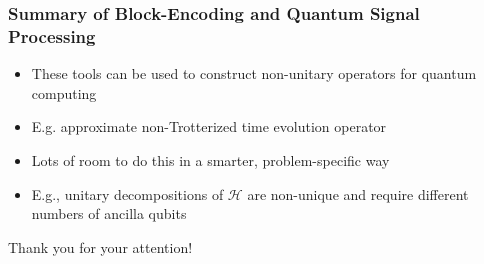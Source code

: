 \documentclass[aspectratio=169]{beamer}
\begin{document}
\begin{frame}
	\frametitle{Summary of Block-Encoding and Quantum Signal Processing}
	\begin{itemize}[<+->]
	\item These tools can be used to construct non-unitary operators for quantum computing
	\item E.g. approximate non-Trotterized time evolution operator
	\item Lots of room to do this in a smarter, problem-specific way
	\item E.g., unitary decompositions of $\mathcal{H}$ are non-unique and require different numbers of ancilla qubits
	\end{itemize}
\end{frame}

\begin{frame}
\begin{center}
	\huge{Thank you for your attention!}
\end{center}
\end{frame}
\end{document}
